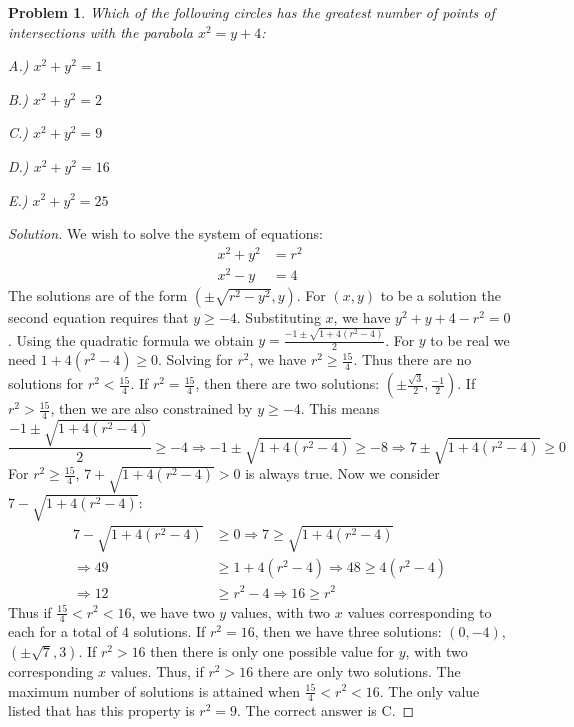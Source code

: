 \documentclass[12pt,oneside]{book}
\theoremstyle{mystyle}
\newtheorem{problem}{Problem}[section]
\begin{document}
\begin{problem}
Which of the following circles has the greatest number of points of intersections with the parabola $x^2 = y+4$:
\begin{enumerate}
\begin{multicols}{5}
\item[A.)] $x^2+y^2 = 1$
\item[B.)] $x^2+y^2 = 2$
\item[C.)] $x^2+y^2 = 9$
\item[D.)] $x^2+y^2 = 16$
\item[E.)] $x^2+y^2=25$
\end{multicols}
\end{enumerate}
\end{problem}
\begin{proof}[Solution]
We wish to solve the system of equations:
\begin{align}
    \nonumber x^2+y^2 &= r^2 \\
    \nonumber x^2-y &= 4
\end{align}
The solutions are of the form $(\pm \sqrt{r^2-y^2},y)$. For $(x,y)$ to be a solution the second equation requires that $y\geq -4$. Substituting $x$, we have $y^2+y+4 - r^2 = 0$. Using the quadratic formula we obtain $y = \frac{-1 \pm \sqrt{1 + 4(r^2-4)}}{2}$. For $y$ to be real we need $1+4(r^2-4) \geq 0$. Solving for $r^2$, we have $r^2 \geq \frac{15}{4}$. Thus there are no solutions for $r^2< \frac{15}{4}$. If $r^2 = \frac{15}{4}$, then there are two solutions: $(\pm \frac{\sqrt{3}}{2}, \frac{-1}{2})$. If $r^2 > \frac{15}{4}$, then we are also constrained by $y\geq -4$. This means 
\begin{equation}
    \nonumber \frac{-1 \pm \sqrt{1+4(r^2-4)}}{2}  \geq -4 \Rightarrow -1 \pm \sqrt{1+4(r^2-4)} \geq -8 \Rightarrow 7  \pm \sqrt{1+4(r^2-4)} \geq 0
\end{equation}
 For $r^2 \geq \frac{15}{4}$, $7+\sqrt{1+4(r^2-4)}>0$ is always true. Now we consider $7-\sqrt{1+4(r^2-4)}:$
\begin{align}
    \nonumber 7-\sqrt{1+4(r^2-4)} &\geq 0 \Rightarrow 7 \geq \sqrt{1+4(r^2-4)} \\
    \nonumber \Rightarrow 49 &\geq 1+4(r^2-4) \Rightarrow 48 \geq 4(r^2-4) \\
    \nonumber \Rightarrow 12 &\geq r^2 - 4 \Rightarrow 16 \geq r^2
\end{align}
Thus if $\frac{15}{4}<r^2<16$, we have two $y$ values, with two $x$ values corresponding to each for a total of $4$ solutions. If $r^2 = 16$, then we have three solutions: $(0,-4)$, $(\pm \sqrt{7},3)$. If $r^2>16$ then there is only one possible value for $y$, with two corresponding $x$ values. Thus, if $r^2>16$ there are only two solutions. The maximum number of solutions is attained when $\frac{15}{4} < r^2 <16$. The only value listed that has this property is $r^2 = 9$. The correct answer is C.
\end{proof}
\end{document}
